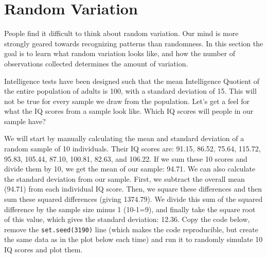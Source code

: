 \documentclass[
  oneside]{book}
\begin{document}
\hypertarget{random-variation}{%
\section{Random Variation}\label{random-variation}}

People find it difficult to think about random variation. Our mind is more strongly geared towards recognizing patterns than randomness. In this section the goal is to learn what random variation looks like, and how the number of observations collected determines the amount of variation.

Intelligence tests have been designed such that the mean Intelligence Quotient of the entire population of adults is 100, with a standard deviation of 15. This will not be true for every sample we draw from the population. Let's get a feel for what the IQ scores from a sample look like. Which IQ scores will people in our sample have?

We will start by manually calculating the mean and standard deviation of a random sample of 10 individuals. Their IQ scores are: 91.15, 86.52, 75.64, 115.72, 95.83, 105.44, 87.10, 100.81, 82.63, and 106.22. If we sum these 10 scores and divide them by 10, we get the mean of our sample: 94.71. We can also calculate the standard deviation from our sample. First, we subtract the overall mean (94.71) from each individual IQ score. Then, we square these differences and then sum these squared differences (giving 1374.79). We divide this sum of the squared difference by the sample size minus 1 (10-1=9), and finally take the square root of this value, which gives the standard deviation: 12.36. Copy the code below, remove the \texttt{set.seed(3190)} line (which makes the code reproducible, but create the same data as in the plot below each time) and run it to randomly simulate 10 IQ scores and plot them.
\end{document}
